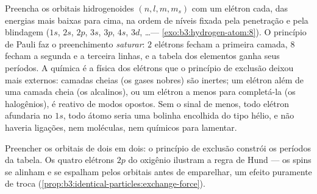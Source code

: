 \begin{proposition}\label{prop:b3:identical-particles:periodic}
Preencha os orbitais hidrogenoides $(n, l, m, m_s)$ com um elétron
cada, das energias mais baixas para cima, na ordem de níveis fixada
pela penetração e pela blindagem ($1s$, $2s$, $2p$, $3s$, $3p$, $4s$,
$3d$, \dots --- \cref{exo:b3:hydrogen-atom:8}). O princípio de Pauli
faz o preenchimento \emph{saturar}: $2$ elétrons fecham a primeira
camada, $8$ fecham a segunda e a terceira linhas, e a tabela dos
elementos ganha seus períodos. A química é a física dos elétrons que o
princípio de exclusão deixou mais externos: camadas cheias (os gases
nobres) são inertes; um elétron além de uma camada cheia (os
alcalinos), ou um elétron a menos para completá-la (os halogênios), é
reativo de modos opostos. Sem o sinal de menos, todo elétron
afundaria no $1s$, todo átomo seria uma bolinha encolhida do tipo
hélio, e não haveria ligações, nem moléculas, nem químicos para
lamentar.
\end{proposition}
\admitted

\begin{omfigure}

{\small Preencher os orbitais de dois em dois: o princípio de exclusão
constrói os períodos da tabela. Os quatro elétrons $2p$ do oxigênio
ilustram a regra de Hund --- os spins se alinham e se espalham pelos
orbitais antes de emparelhar, um efeito puramente de troca
(\cref{prop:b3:identical-particles:exchange-force}).}
\end{omfigure}

